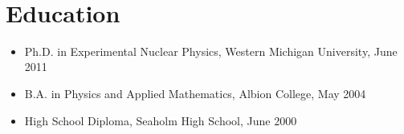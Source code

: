 \clearpage
\pagestyle{fancy}
\lhead{\textbf{\shortname}}
%

\begin{changemargin}{\indent}
\nameaddress{\homeaddress}\\
\end{changemargin}
\section*{Education}
\begin{itemize}
		\item Ph.D. in Experimental Nuclear Physics, Western Michigan University, June 2011%
	\item B.A. in Physics and Applied Mathematics, Albion College, May 2004 %
	\item High School Diploma, Seaholm High School, June 2000 %
\end{itemize}
